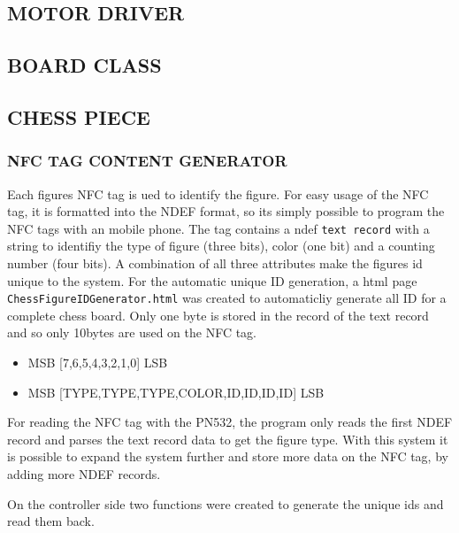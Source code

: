 \documentclass[
  english,
  paper=a4,
  ,captions=tableheading
]{scrartcl}
\newcommand{\passthrough}[1]{#1}
\providecommand{\tightlist}{%
  \setlength{\itemsep}{0pt}\setlength{\parskip}{0pt}}
\begin{document}
\hypertarget{motor-driver}{%
\subsection{MOTOR DRIVER}\label{motor-driver}}

\hypertarget{board-class}{%
\subsection{BOARD CLASS}\label{board-class}}

\hypertarget{chess-piece}{%
\subsection{CHESS PIECE}\label{chess-piece}}

\hypertarget{nfc-tag-content-generator}{%
\subsubsection{NFC TAG CONTENT
GENERATOR}\label{nfc-tag-content-generator}}

Each figures NFC tag is ued to identify the figure. For easy usage of
the NFC tag, it is formatted into the NDEF format, so its simply
possible to program the NFC tags with an mobile phone. The tag contains
a ndef \passthrough{\lstinline!text record!} with a string to identifiy
the type of figure (three bits), color (one bit) and a counting number
(four bits). A combination of all three attributes make the figures id
unique to the system. For the automatic unique ID generation, a html
page \passthrough{\lstinline!ChessFigureIDGenerator.html!} was created
to automaticliy generate all ID for a complete chess board. Only one
byte is stored in the record of the text record and so only 10bytes are
used on the NFC tag.

\begin{itemize}
\tightlist
\item
  MSB {[}7,6,5,4,3,2,1,0{]} LSB
\item
  MSB {[}TYPE,TYPE,TYPE,COLOR,ID,ID,ID,ID{]} LSB
\end{itemize}

For reading the NFC tag with the PN532, the program only reads the first
NDEF record and parses the text record data to get the figure type. With
this system it is possible to expand the system further and store more
data on the NFC tag, by adding more NDEF records.

On the controller side two functions were created to generate the unique
ids and read them back.
\end{document}
